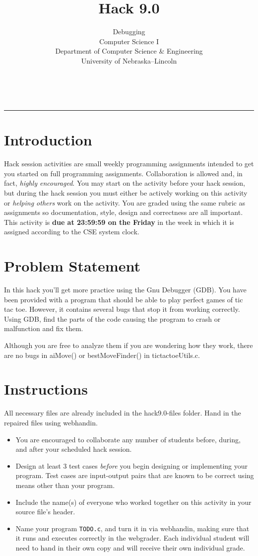 \documentclass[12pt]{scrartcl}
\title{Hack 9.0}\let\Title\@title
\subtitle{Debugging \\
Computer Science I\\
{\small
\vskip1cm
Department of Computer Science \& Engineering \\
University of Nebraska--Lincoln}
\vskip-1cm}
\date{~}
\begin{document}
\maketitle

\hrule

\section*{Introduction}

Hack session activities are small weekly programming assignments intended
to get you started on full programming assignments.  Collaboration is allowed
and, in fact, \emph{highly encouraged}.  You may start on the activity before
your hack session, but during the hack session you must either be actively 
working on this activity or \emph{helping others} work on the activity.
You are graded using the same rubric as assignments so documentation, style, 
design and correctness are all important.  This activity is \textbf{due 
at 23:59:59 on the Friday} in the week in which it is assigned according 
to the CSE system clock.


\section*{Problem Statement}
In this hack you'll get more practice using the Gnu Debugger (GDB). You have been provided with a program that should be able to play perfect
games of tic tac toe. However, it contains several bugs that stop it from working correctly. Using GDB, find the parts of the code causing the program
to crash or malfunction and fix them.

Although you are free to analyze them if you are wondering how they work, there are no bugs in aiMove() or bestMoveFinder() in tictactoeUtils.c. 

\section*{Instructions}
All necessary files are already included in the hack9.0-files folder. Hand in the repaired files using webhandin.
\begin{itemize}
  \item You are encouraged to collaborate any number of students 
  before, during, and after your scheduled hack session.  
  \item Design at least 3 test cases \emph{before} you begin
  designing or implementing your program.  Test cases are 
  input-output pairs that are known to be correct using means
  other than your program.
  \item Include the name(s) of everyone who worked together on
  this activity in your source file's header.
  \item Name your program \texttt{TODO.c}, and
  turn it in via webhandin, making sure that it runs and executes
  correctly in the webgrader.  Each individual student will need
  to hand in their own copy and will receive their own individual
  grade.
\end{itemize}
  
\end{document}
